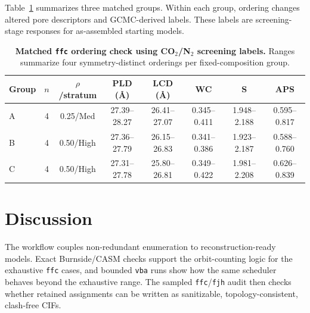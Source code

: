 \documentclass[pdflatex,sn-mathphys-num]{sn-jnl}
\theoremstyle{thmstyleone}%
\begin{document}
Table~\ref{tab:ffc_co2n2_ordering} summarizes three matched groups. Within each group, ordering changes altered pore descriptors and GCMC-derived labels. These labels are screening-stage responses for as-assembled starting models.

\begin{table}[htbp]
\centering
\scriptsize
\caption{\textbf{Matched \texttt{ffc} ordering check using CO$_2$/N$_2$ screening labels.} Ranges summarize four symmetry-distinct orderings per fixed-composition group.}
\label{tab:ffc_co2n2_ordering}
\setlength{\tabcolsep}{1.0mm}
\renewcommand{\arraystretch}{1.12}
\begin{tabular}{@{}lccccccc@{}}
\toprule
\textbf{Group} & \textbf{$n$} & \textbf{$\rho$/stratum} & \textbf{PLD (\AA)} & \textbf{LCD (\AA)} & \textbf{WC} & \textbf{S} & \textbf{APS} \\
\midrule
A & 4 & 0.25/Med & 27.39--28.27 & 26.41--27.07 & 0.345--0.411 & 1.948--2.188 & 0.595--0.817 \\
B & 4 & 0.50/High & 27.36--27.79 & 26.15--26.83 & 0.341--0.386 & 1.923--2.187 & 0.588--0.760 \\
C & 4 & 0.50/High & 27.31--27.78 & 25.80--26.81 & 0.349--0.422 & 1.981--2.208 & 0.626--0.839 \\
\bottomrule
\end{tabular}
\end{table}



\section*{Discussion}
\label{sec:discussion}
The workflow couples non-redundant enumeration to reconstruction-ready models. Exact Burnside/CASM checks support the orbit-counting logic for the exhaustive \texttt{ffc} cases, and bounded \texttt{vba} runs show how the same scheduler behaves beyond the exhaustive range. The sampled \texttt{ffc}/\texttt{fjh} audit then checks whether retained assignments can be written as sanitizable, topology-consistent, clash-free CIFs.
\end{document}
